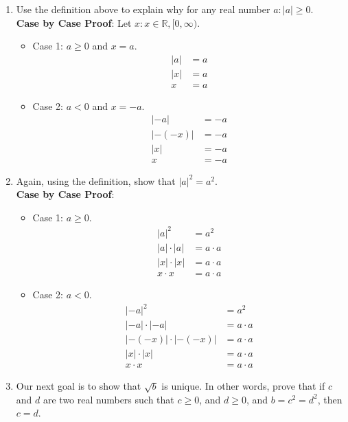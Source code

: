 \documentclass{article}
\begin{document}
\begin{enumerate}[label = \textbf{\alph*)}]
	\item Use the definition above to explain why for any real number $ a : \left| a \right| \geq 0 $. \\
		\textbf{Case by Case Proof}: Let $ x : x \in \mathbb{R}, [0, \infty ) $.
		\begin{itemize}
			\item Case 1: $ a \geq 0 $ and $ x = a $.
				\begin{align*}
					|a| & = a \\
					|x| & = a \\
					x & = a
				\end{align*}
			\item Case 2: $ a < 0 $ and $ x = -a $.
				\begin{align*}
					|-a| & = -a \\
					|-(-x)| & = -a \\
					|x| & = -a \\
					x & = -a
				\end{align*}
		\end{itemize}
	\item Again, using the definition, show that $ |a|^2 = a^2 $. \\
		\textbf{Case by Case Proof}:
		\begin{itemize}
			\item Case 1: $ a \geq 0 $.
				\begin{align*}
					|a|^2 & = a^2 \\
					|a| \cdot |a| & = a \cdot a \\
					|x| \cdot |x| & = a \cdot a \\
					x \cdot x & = a \cdot a
				\end{align*}
			\item Case 2: $ a < 0 $.
				\begin{align*}
					|-a|^2 & = a^2 \\
					|-a| \cdot |-a| & = a \cdot a \\
					|-(-x)| \cdot |-(-x)| & = a \cdot a \\
					|x| \cdot |x| & = a \cdot a \\
					x \cdot x & = a \cdot a
				\end{align*}
		\end{itemize}
	\item Our next goal is to show that $ \sqrt{b} $ is unique. In other words, prove that if $ c $ and $ d $ are two real numbers such that $ c \geq 0 $, and $ d \geq 0 $, and $ b = c^2 = d^2 $, then $ c = d $.

\end{enumerate}
\end{document}
